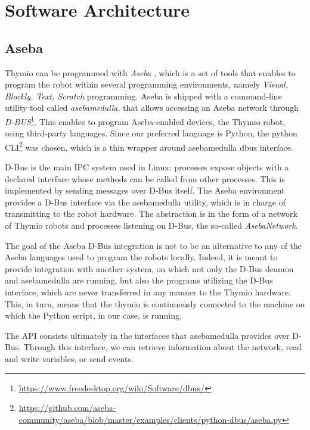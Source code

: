 \section{Software Architecture}

\subsection{Aseba}

Thymio can be programmed with \emph{Aseba} \citep{retornaz2013seamless}, which is a set of tools that enables to program the robot within several programming environments, namely \emph{Visual, Blockly, Text, Scratch} programming. Aseba is shipped with a command-line utility tool called \emph{asebamedulla}, that allows accessing an Aseba network through \emph{D-BUS}\footnote{\url{https://www.freedesktop.org/wiki/Software/dbus/}}. This enables to program Aseba-enabled devices, the Thymio robot, using third-party languages. Since our preferred language is Python, the python CLI\footnote{\url{https://github.com/aseba-community/aseba/blob/master/examples/clients/python-dbus/aseba.py}} was chosen, which is a thin wrapper around asebamedulla dbus interface.

D-Bus is the main IPC system used in Linux: processes expose objects with a declared interface whose methods can be called from other processes. This is implemented by sending messages over D-Bus itself. The Aseba environment provides a D-Bus interface via the asebamedulla utility, which is in charge of transmitting to the robot hardware. The abstraction is in the form of a network of Thymio robots and processes listening on D-Bus, the so-called \emph{AsebaNetwork}.

The goal of the Aseba D-Bus integration is not to be an alternative to any of the Aseba languages used to program the robots locally. Indeed, it is meant to provide integration with another system, on which not only the D-Bus deamon and asebamedulla are running, but also the programs utilizing the D-Bus interface, which are never transferred in any manner to the Thymio hardware. This, in turn, means that the thymio is continuously connected to the machine on which the Python script, in our case, is running.

The API consists ultimately in the interfaces that asebamedulla provides over D-Bus. Through this interface, we can retrieve information about the network, read and write variables, or send events.

